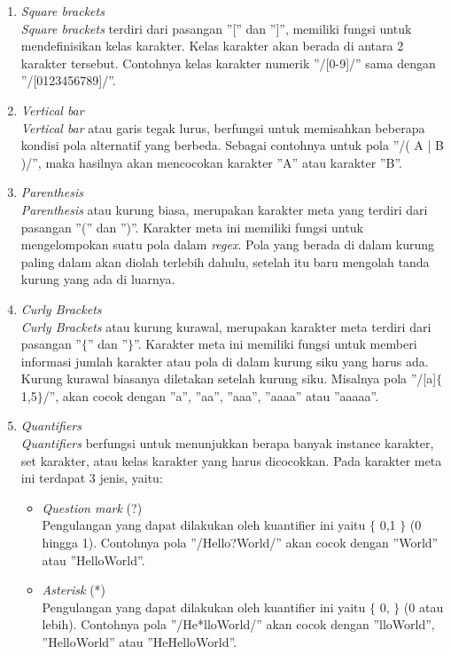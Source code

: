 \begin{enumerate}
	\item \textit{Square brackets} \\
	\textit{Square brackets} terdiri dari pasangan ''['' dan '']'', memiliki fungsi untuk mendefinisikan kelas karakter. Kelas karakter akan berada di antara 2 karakter tersebut. Contohnya kelas karakter numerik ''/[0-9]/'' sama dengan ''/[0123456789]/''.
	
	\item \textit{Vertical bar} \\
	\textit{Vertical bar} atau garis tegak lurus, berfungsi untuk memisahkan beberapa kondisi pola alternatif yang berbeda. Sebagai contohnya untuk pola ''/( A | B )/'', maka hasilnya akan mencocokan karakter ''A'' atau karakter ''B''.
	
	\item \textit{Parenthesis} \\
	\textit{Parenthesis} atau kurung biasa, merupakan karakter meta yang terdiri dari pasangan ''('' dan '')''. Karakter meta ini memiliki fungsi untuk mengelompokan suatu pola dalam \textit{regex}. Pola yang berada di dalam kurung paling dalam akan diolah terlebih dahulu, setelah itu baru mengolah tanda kurung yang ada di luarnya.
	
	\item \textit{Curly Brackets} \\
	\textit{Curly Brackets} atau kurung kurawal, merupakan karakter meta terdiri dari pasangan ''$\lbrace$'' dan ''$\rbrace$''. Karakter meta ini memiliki fungsi untuk memberi informasi jumlah karakter atau pola di dalam kurung siku yang harus ada. Kurung kurawal biasanya diletakan setelah kurung siku. Misalnya pola ''/[a]$\lbrace$1,5$\rbrace$/'', akan cocok dengan ''a'', ''aa'', ''aaa'', ''aaaa'' atau ''aaaaa''.	
	
	\item \textit{Quantifiers} \\
	\textit{Quantifiers} berfungsi untuk menunjukkan berapa banyak instance karakter, set karakter, atau kelas karakter yang harus dicocokkan. Pada karakter meta ini terdapat 3 jenis, yaitu:
	\begin{itemize}
		\item \textit{Question mark} (?)\\
		Pengulangan yang dapat dilakukan oleh kuantifier ini yaitu $\lbrace$ 0,1 $\rbrace$ (0 hingga 1). Contohnya pola ''/Hello?World/'' akan cocok dengan ''World'' atau ''HelloWorld''.
		
		\item \textit{Asterisk} (*) \\
		Pengulangan yang dapat dilakukan oleh kuantifier ini yaitu $\lbrace$ 0, $\rbrace$ (0 atau lebih). Contohnya pola ''/He*lloWorld/'' akan cocok dengan ''lloWorld'', ''HelloWorld'' atau ''HeHelloWorld''.
		 

\end{itemize}
\end{enumerate}
